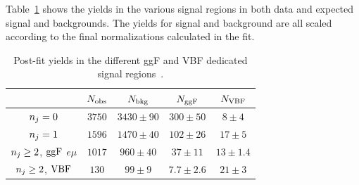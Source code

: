 Table~\ref{tab:final-yields} shows the yields in the various signal regions in both data and expected signal and backgrounds. The yields for signal and background are all scaled according to the final normalizations calculated in the fit. 

\begin{table}[h!]
\centering
\captionsetup{justification=centering}

\hspace{-10pt}
\begin{tabular}{|c|c|c|c|c|}
\hline
 & $N_{\rm obs}$ & $N_{\rm bkg}$ & $N_{\rm ggF}$ & $N_{\rm VBF}$ \\ \hline
$n_j = 0$ & $3750$ & $3430 \pm 90$ & $300 \pm 50$ & $8 \pm 4$ \\ \hline
$n_j = 1$ & $1596$ & $1470 \pm 40$ & $102 \pm 26$ & $17 \pm 5$ \\ \hline
$n_j \geq 2$, $\rm ggF$ $e\mu$ & $1017$ & $960 \pm 40$ & $37 \pm 11$ & $13 \pm 1.4$ \\ \hline
$n_j \geq 2$, $\rm VBF$ & $130$ & $99 \pm 9$ & $7.7 \pm 2.6$ & $21 \pm 3$ \\ \hline
\end{tabular}

\caption{
Post-fit yields in the different ggF and VBF dedicated signal regions~\cite{WW2015}. 
}
\label{tab:final-yields}
\end{table}

